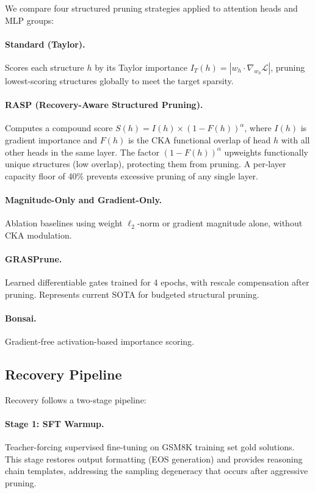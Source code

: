 \documentclass[11pt,a4paper]{article}
\begin{document}
We compare four structured pruning strategies applied to attention heads and MLP groups:

\paragraph{Standard (Taylor).}
Scores each structure $h$ by its Taylor importance $I_T(h) = |w_h \cdot \nabla_{w_h} \mathcal{L}|$, pruning lowest-scoring structures globally to meet the target sparsity.

\paragraph{RASP (Recovery-Aware Structured Pruning).}
Computes a compound score $S(h) = I(h) \times (1 - F(h))^\alpha$, where $I(h)$ is gradient importance and $F(h)$ is the CKA functional overlap of head $h$ with all other heads in the same layer.
The factor $(1 - F(h))^\alpha$ upweights functionally unique structures (low overlap), protecting them from pruning.
A per-layer capacity floor of 40\% prevents excessive pruning of any single layer.

\paragraph{Magnitude-Only and Gradient-Only.}
Ablation baselines using weight $\ell_2$-norm or gradient magnitude alone, without CKA modulation.

\paragraph{GRASPrune.}
Learned differentiable gates trained for 4 epochs, with rescale compensation after pruning.
Represents current SOTA for budgeted structural pruning.

\paragraph{Bonsai.}
Gradient-free activation-based importance scoring.

\subsection{Recovery Pipeline}
\label{sec:recovery}

Recovery follows a two-stage pipeline:

\paragraph{Stage 1: SFT Warmup.}
Teacher-forcing supervised fine-tuning on GSM8K training set gold solutions.
This stage restores output formatting (EOS generation) and provides reasoning chain templates, addressing the sampling degeneracy that occurs after aggressive pruning.
\end{document}
